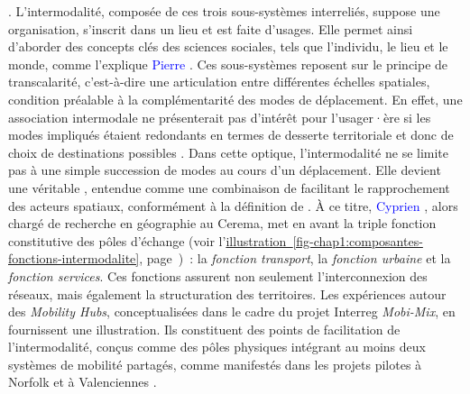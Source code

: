 \begin{refsegment}
{} \textcolor{blue}{\autocites[65]{bozzani_intermodalite_2005}[167]{bozzani_grandes_2006}}. L’intermodalité, composée de ces trois sous-systèmes interreliés, suppose une organisation, s’inscrit dans un lieu et est faite d'usages. Elle permet ainsi d’aborder des concepts clés des sciences sociales, tels que l’individu, le lieu et le monde, comme l'explique \textcolor{blue}{Pierre} \textcolor{blue}{\textcite[490]{ageron_intermodalite-voyageurs_2013}}. Ces sous-systèmes reposent sur le principe de transcalarité, c’est-à-dire une articulation entre différentes échelles spatiales, condition préalable à la complémentarité des modes de déplacement. En effet, une association intermodale ne présenterait pas d’intérêt pour l’usager·ère si les modes impliqués étaient redondants en termes de desserte territoriale et donc de choix de destinations possibles \textcolor{blue}{\autocite[45]{ageron_intermodalite-voyageurs_2013}}. Dans cette optique, l’intermodalité ne se limite pas à une simple succession de modes au cours d’un déplacement. Elle devient une véritable , entendue comme une combinaison de  facilitant le rapprochement des acteurs spatiaux, conformément à la définition de \textcolor{blue}{\textcite[6]{gumuchian_ressource_2007}}. À ce titre, \textcolor{blue}{Cyprien} \textcolor{blue}{\textcite[14]{richer_lemergence_2008}}, alors chargé de recherche en géographie au \acrshort{Cerema}, met en avant la triple fonction constitutive des pôles d’échange (voir l'\hyperref[fig-chap1:composantes-fonctions-intermodalite]{illustration~\ref{fig-chap1:composantes-fonctions-intermodalite}}, page~\pageref{fig-chap1:tad-murdoch})~: la \textsl{fonction transport}, la \textsl{fonction urbaine} et la \textsl{fonction services}. Ces fonctions assurent non seulement l’interconnexion des réseaux, mais également la structuration des territoires. Les expériences autour des \textsl{Mobility Hubs}, conceptualisées dans le cadre du projet Interreg \textsl{Mobi-Mix}, en fournissent une illustration. Ils constituent des points de facilitation de l’intermodalité, conçus comme des pôles physiques intégrant au moins deux systèmes de mobilité partagés, comme manifestés dans les projets pilotes à Norfolk et à Valenciennes \textcolor{blue}{\autocites[3~498]{hachette_exploring_2023}[248]{hachette_mobility_2023}}.%


\end{refsegment}

